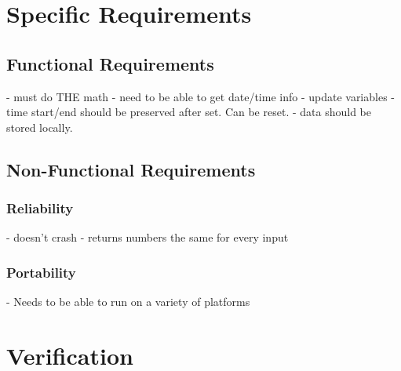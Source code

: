 \documentclass[10pt,draftclsnofoot,onecolumn]{IEEEtran}
\begin{document}
\section{Specific Requirements}

\subsection{Functional Requirements}
- must do THE math
- need to be able to get date/time info
- update variables
- time start/end should be preserved after set. Can be reset.
- data should be stored locally.

\subsection{Non-Functional Requirements}
\subsubsection{Reliability}
- doesn't crash
- returns numbers the same for every input
\subsubsection{Portability}
- Needs to be able to run on a variety of platforms

\section{Verification}
\end{document}
